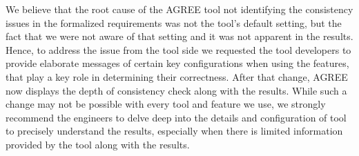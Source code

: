 We believe that the root cause of the AGREE tool not identifying the consistency issues in the formalized requirements was not the tool's default setting, but the fact that we were not aware of that setting and it was not apparent in the results. Hence, to address the issue from the tool side we requested the tool developers to provide elaborate messages of certain key configurations when using the features, that play a key role in determining their correctness. After that change, AGREE now displays the depth of consistency check along with the results. While such a change may not be possible with every tool and feature we use, we strongly recommend the engineers to delve deep into the details and configuration of tool to precisely understand the results, especially when there is limited information provided by the tool along with the results. %




%
%
%
